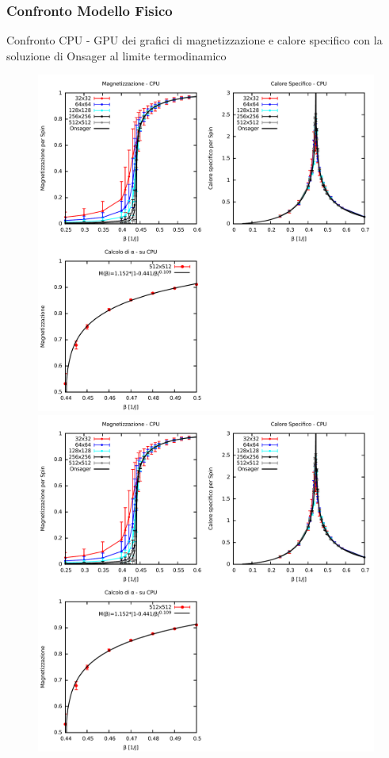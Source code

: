 \documentclass{beamer}
\begin{document}
	\begin{frame}
		\frametitle{Confronto Modello Fisico}
		Confronto CPU - GPU dei grafici di magnetizzazione e calore specifico con la soluzione di Onsager al limite termodinamico
		\begin{figure}
				\includegraphics[scale=0.18]{../../CPU/Result/Ising_Mag_Cv.pdf}	
				\includegraphics[scale=0.18]{../../CPU/Result/Ising_Mag_Cv.pdf}
		\end{figure}

	\end{frame}
\end{document}
